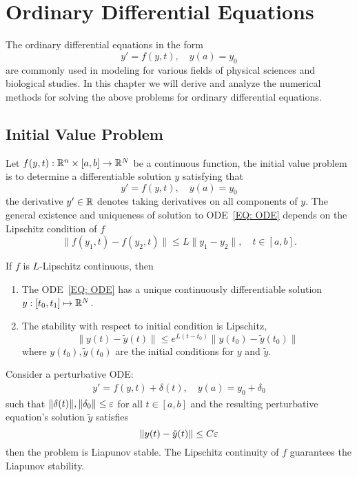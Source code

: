 \chapter{Ordinary Differential Equations}
The ordinary differential equations in the form
$$y' = f(y, t),\quad y(a) = y_0$$
are commonly used in modeling for various fields of physical sciences and biological studies. In this chapter we will derive and analyze the numerical methods for solving the above problems for ordinary differential equations.
\section{Initial Value Problem}
Let $f(y, t): \mathbb R^n\times [a, b]\to \mathbb R^N$ be a continuous function, the initial value problem is to determine a differentiable solution $y$ satisfying that 
\begin{equation}\label{EQ: ODE}
    y' = f(y, t),\quad y(a) = y_0
\end{equation}
the derivative $y'\in\mathbb R$ denotes taking derivatives on all components of $y$. The general existence and uniqueness of solution to ODE~\eqref{EQ: ODE} depends on the Lipschitz condition of $f$
$$\|f(y_1, t) - f(y_2, t)\|\le L\|y_1 - y_2\|,\quad t\in[a, b].$$
\begin{theorem}
    If $f$ is $L$-Lipschitz continuous, then 
    \begin{enumerate}
        \item The ODE~\eqref{EQ: ODE} has a unique continuously differentiable solution $y: [t_0, t_1]\mapsto \mathbb R^N$.
        \item The stability with respect to initial condition is Lipschitz, 
        $$\|y(t) - \tilde{y}(t)\|\le e^{L(t- t_0)}\|y(t_0) - \tilde{y}(t_0)\|$$
        where $y(t_0), \tilde{y}(t_0)$ are the initial conditions for $y$ and $\tilde{y}$.
    \end{enumerate}
\end{theorem}
\begin{remark}
    Consider a perturbative ODE:
    \begin{equation}
        \begin{aligned}
            y' = f(y, t) + \delta(t),\quad y(a) = y_0 + \delta_0
        \end{aligned}
    \end{equation}
    such that $\|\delta(t)\|, \|\delta_0\|\le \varepsilon$ for all $t\in [a, b]$ and the resulting perturbative equation's solution $\tilde{y}$ satisfies 
    $$\|y(t) - \tilde{y}(t)\|\le C\varepsilon$$
    then the problem is Liapunov stable. The Lipschitz continuity of $f$ guarantees the Liapunov stability.
\end{remark}
